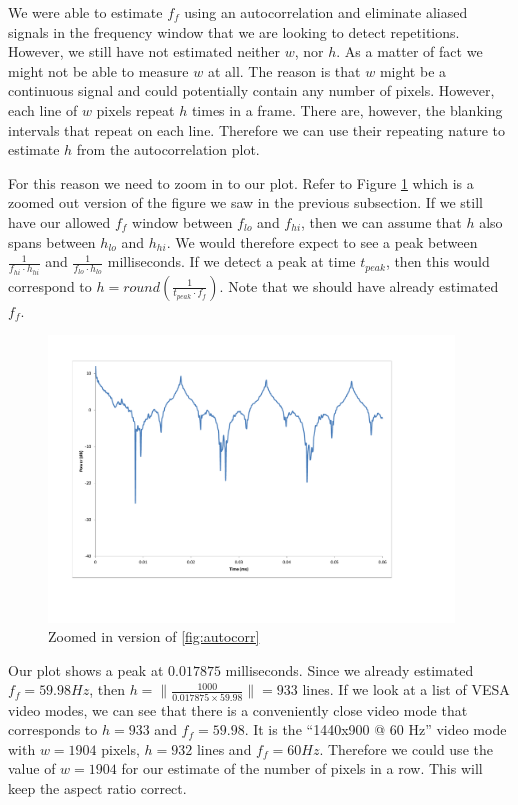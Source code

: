 \documentclass[a4paper,12pt,twoside,openright]{report}
\begin{document}
We were able to estimate $f_{f}$ using an autocorrelation and eliminate aliased signals in the frequency window that we are looking to detect repetitions. However, we still have not estimated neither $w$, nor $h$. As a matter of fact we might not be able to measure $w$ at all. The reason is that $w$ might be a continuous signal and could potentially contain any number of pixels. However, each line of $w$ pixels repeat $h$ times in a frame. There are, however, the blanking intervals that repeat on each line. Therefore we can use their repeating nature to estimate $h$ from the autocorrelation plot.

For this reason we need to zoom in to our plot. Refer to Figure \ref{fig:autocorr_zoomed} which is a zoomed out version of the figure we saw in the previous subsection. If we still have our allowed $f_{f}$ window between $f_{lo}$ and $f_{hi}$, then we can assume that $h$ also spans between $h_{lo}$ and $h_{hi}$. We would therefore expect to see a peak between $\frac{1}{f_{hi} \cdot h_{hi}}$ and $\frac{1}{f_{lo} \cdot h_{lo}}$ milliseconds. If we detect a peak at time $t_{peak}$, then this would correspond to $h = round \left( \frac{1}{t_{peak} \cdot f_{f}} \right)$. Note that we should have already estimated $f_{f}$.

\begin{figure}[h]
\centering
  \includegraphics[width=0.96\textwidth]{autocorr_zoomed}
  \caption{Zoomed in version of \ref{fig:autocorr}}
  \label{fig:autocorr_zoomed}
\end{figure}

Our plot shows a peak at $0.017875$ milliseconds. Since we already estimated $f_{f} = 59.98 Hz$, then $h = \| \frac{1000}{0.017875 \times 59.98} \| = 933$ lines. If we look at a list of VESA video modes, we can see that there is a conveniently close video mode that corresponds to $h = 933$ and $f_{f} = 59.98$. It is the ``1440x900 @ 60 Hz'' video mode with $w = 1904$ pixels, $h = 932$ lines and $f_{f}=60 Hz$. Therefore we could use the value of $w = 1904$ for our estimate of the number of pixels in a row. This will keep the aspect ratio correct.
\end{document}
